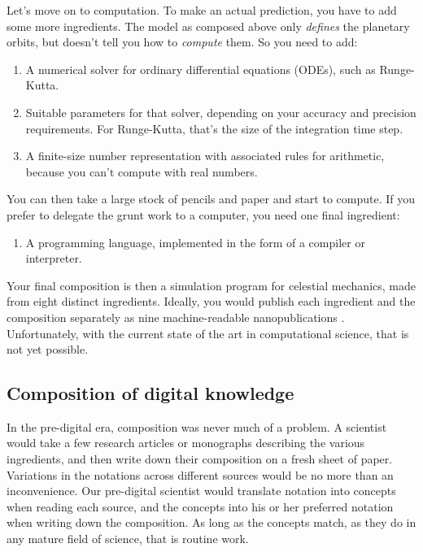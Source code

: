 Let's move on to computation. To make an actual prediction, you have to add some more ingredients. The model as composed above only \textit{defines} the planetary orbits, but doesn't tell you how to \textit{compute} them. So you need to add:

\begin{enumerate}
\setcounter{enumi}{\themyCounter}
\item A numerical solver for ordinary differential equations (ODEs), such as Runge-Kutta.
\item Suitable parameters for that solver, depending on your accuracy and precision requirements. For Runge-Kutta, that's the size of the integration time step.
\item A finite-size number representation with associated rules for arithmetic, because you can't compute with real numbers.
\setcounter{myCounter}{\theenumi}
\end{enumerate}

You can then take a large stock of pencils and paper and start to compute. If you prefer to delegate the grunt work to a computer, you need one final ingredient:

\begin{enumerate}
\setcounter{enumi}{\themyCounter}
\item A programming language, implemented in the form of a compiler or interpreter.
\end{enumerate}

Your final composition is then a simulation program for celestial mechanics, made from eight distinct ingredients. Ideally, you would publish each ingredient and the composition separately as nine machine-readable nanopublications \cite{groth_anatomy_2010}. Unfortunately, with the current state of the art in computational science, that is not yet possible.

\subsection{Composition of digital knowledge}
\label{composition-digital}

In the pre-digital era, composition was never much of a problem. A scientist would take a few research articles or monographs describing the various ingredients, and then write down their composition on a fresh sheet of paper. Variations in the notations across different sources would be no more than an inconvenience. Our pre-digital scientist would translate notation into concepts when reading each source, and the concepts into his or her preferred notation when writing down the composition. As long as the concepts match, as they do in any mature field of science, that is routine work.

